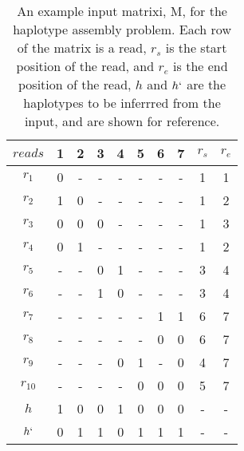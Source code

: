 \documentclass[10pt,twocolumn]{witseiepaper}
\begin{document}
\begin{table}[h!]
\centering
\caption{An example input matrixi, M, for the haplotype assembly problem. Each row of the matrix is a read, 
        $r_s$ is the start position of the read, and $r_e$ is the end position of the read, $h$ and $h`$ are
        the haplotypes to be inferrred from the input, and are shown for reference.}
\label{tab:exinp}   
\begin{tabular}{c c c c c c c c c c}
    \hline 
    $reads$     & 1     & 2     & 3     & 4     & 5     & 6     & 7     & $r_s$     & $r_e$         \\
    \hline
    $r_1$       & 0     & -     & -     & -     & -     & -     & -     & 1         & 1             \\
    $r_2$       & 1     & 0     & -     & -     & -     & -     & -     & 1         & 2             \\
    $r_3$       & 0     & 0     & 0     & -     & -     & -     & -     & 1         & 3             \\
    $r_4$       & 0     & 1     & -     & -     & -     & -     & -     & 1         & 2             \\
    $r_5$       & -     & -     & 0     & 1     & -     & -     & -     & 3         & 4             \\
    $r_6$       & -     & -     & 1     & 0     & -     & -     & -     & 3         & 4             \\
    $r_7$       & -     & -     & -     & -     & -     & 1     & 1     & 6         & 7             \\
    $r_8$       & -     & -     & -     & -     & -     & 0     & 0     & 6         & 7             \\
    $r_9$       & -     & -     & -     & 0     & 1     & -     & 0     & 4         & 7             \\
    $r_10$      & -     & -     & -     & -     & 0     & 0     & 0     & 5         & 7             \\
    \hline                                                                                          
    \hline                                                                                          
    $h$         & 1     & 0     & 0     & 1     & 0     & 0     & 0     & -         & -               \\
    $h`$        & 0     & 1     & 1     & 0     & 1     & 1     & 1     & -         & -               \\
    \hline
\end{tabular}
\end{table}
\end{document}

